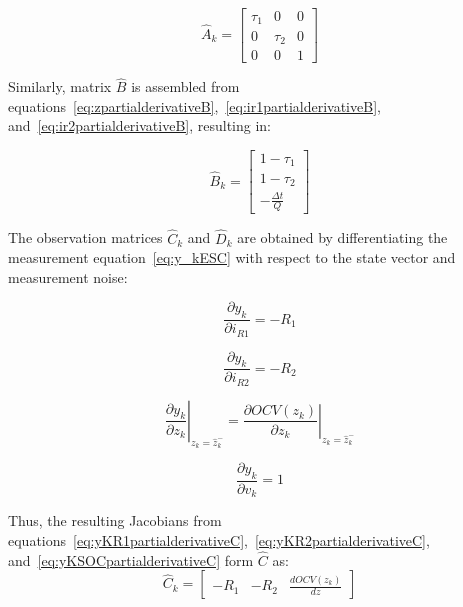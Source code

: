 \begin{equation}
    \hat{A}_k = \begin{bmatrix}
    \tau_1 & 0 & 0 \\
    0 & \tau_2 & 0 \\
    0 & 0 & 1
    \label{Amatrix}
    \end{bmatrix}
\end{equation}

Similarly, matrix $\hat{B}$ is assembled from equations~\eqref{eq:zpartialderivativeB},~\eqref{eq:ir1partialderivativeB}, 
and~\eqref{eq:ir2partialderivativeB}, resulting in:

\begin{equation}
    \hat{B}_k = \begin{bmatrix}
    1 - \tau_1 \\
    1 - \tau_2 \\
    -\frac{\Delta t}{Q}
    \label{Bmatrix}
    \end{bmatrix}
\end{equation}

The observation matrices $\hat{C}_k$ and $\hat{D}_k$ are obtained by differentiating the 
measurement equation~\eqref{eq:y_kESC} with respect to the state vector and measurement noise:

\begin{equation}
    \frac{\partial y_k}{\partial i_{R1}} = -R_1
    \label{eq:yKR1partialderivativeC}
\end{equation}

\begin{equation}
    \frac{\partial y_k}{\partial i_{R2}} = -R_2
    \label{eq:yKR2partialderivativeC}
\end{equation}

\begin{equation}
    \left. \frac{\partial y_k}{\partial z_k} \right|_{z_k = \hat{z}_k^-} = 
    \left. \frac{\partial OCV(z_k)}{\partial z_k} \right|_{z_k = \hat{z}_k^-}
    \label{eq:yKSOCpartialderivativeC}
\end{equation}

\begin{equation}
    \frac{\partial y_k}{\partial v_{k}} = 1
    \label{eq:yKvKpartialderivativeD}
\end{equation}

Thus, the resulting Jacobians from equations~\eqref{eq:yKR1partialderivativeC},~\eqref{eq:yKR2partialderivativeC}, 
and~\eqref{eq:yKSOCpartialderivativeC} form $\hat{C}$ as:
\begin{equation}
    \hat{C}_k = \begin{bmatrix}
    -R_1 & -R_2 & \frac{dOCV(z_k)}{dz}
    \label{Cmatrix}
    \end{bmatrix}
\end{equation}

